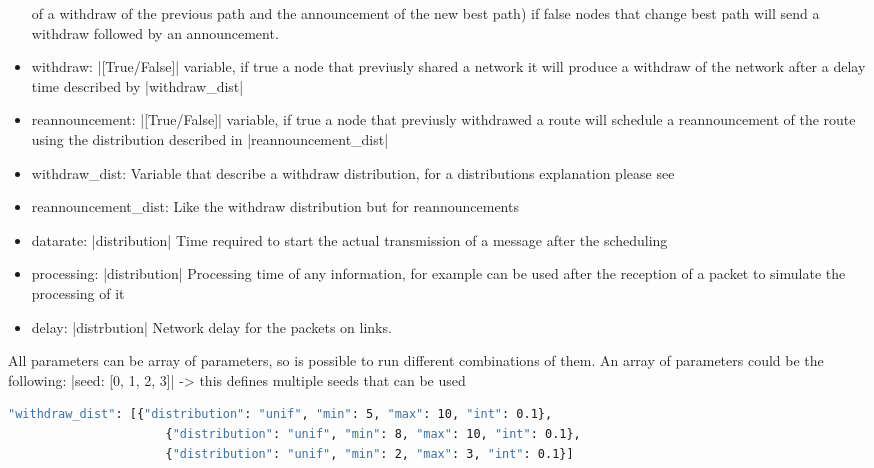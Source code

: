 \documentclass[10pt,journal,onecolumn]{IEEEtran}
\begin{document}
\begin{itemize}
		of a withdraw of the previous path and the announcement of the new 
		best path) if false nodes that change best path will send a withdraw 
		followed by an announcement.
    \item withdraw: |[True/False]| variable, if true a node that previusly 
		shared a network it will produce a withdraw of the network after a delay 
		time described by |withdraw_dist|
    \item reannouncement: |[True/False]| variable, if true a node that previusly 
		withdrawed a route will schedule a reannouncement of the route 
		using the distribution described in |reannouncement_dist|
    \item withdraw\_dist: Variable that describe a withdraw distribution, 
		for a distributions explanation please see 
    \item reannouncement\_dist: Like the withdraw distribution but for reannouncements
    \item datarate: |{distribution}| Time required to start the actual 
		transmission of a message after the scheduling
    \item processing: |{distribution}| Processing time of any information, 
		for example can be used after the reception of a packet to 
		simulate the processing of it
    \item delay: |{distrbution}| Network delay for the packets on links.
\end{itemize}

All parameters can be array of parameters, so is possible to run different 
combinations of them.
An array of parameters could be the following:
|seed: [0, 1, 2, 3]| -> this defines multiple seeds that can be used

\begin{lstlisting}[language=bash]
	"withdraw_dist": [{"distribution": "unif", "min": 5, "max": 10, "int": 0.1}, 
					  {"distribution": "unif", "min": 8, "max": 10, "int": 0.1}, 
					  {"distribution": "unif", "min": 2, "max": 3, "int": 0.1}]
\end{lstlisting}
\end{document}
